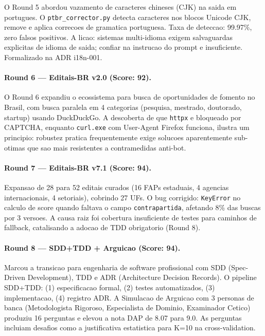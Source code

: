 O Round 5 abordou vazamento de caracteres chineses (CJK) na saida em
portugues. O \texttt{ptbr\_corrector.py} detecta caracteres nos blocos
Unicode CJK, remove e aplica correcoes de gramatica portuguesa. Taxa
de deteccao: 99.97\%, zero falsos positivos. A licao: sistemas
multi-idioma exigem salvaguardas explicitas de idioma de saida; confiar
na instrucao do prompt e insuficiente. Formalizado na ADR i18n-001.

\paragraph{Round 6 --- Editais-BR v2.0 (Score: 92).}

O Round 6 expandiu o ecossistema para busca de oportunidades de fomento
no Brasil, com busca paralela em 4 categorias (pesquisa, mestrado,
doutorado, startup) usando DuckDuckGo. A descoberta de que \texttt{httpx}
e bloqueado por CAPTCHA, enquanto \texttt{curl.exe} com User-Agent Firefox
funciona, ilustra um principio: robustez pratica frequentemente exige
solucoes aparentemente sub-otimas que sao mais resistentes a contramedidas
anti-bot.

\paragraph{Round 7 --- Editais-BR v7.1 (Score: 94).}

Expansao de 28 para 52 editais curados (16 FAPs estaduais, 4 agencias
internacionais, 4 setoriais), cobrindo 27 UFs. O bug corrigido:
\texttt{KeyError} no calculo de score quando faltava o campo
\texttt{contrapartida}, afetando 8\% das buscas por 3 versoes. A causa
raiz foi cobertura insuficiente de testes para caminhos de fallback,
catalisando a adocao de TDD obrigatorio (Round 8).

\paragraph{Round 8 --- SDD+TDD + Arguicao (Score: 94).}

Marcou a transicao para engenharia de software profissional com SDD
(Spec-Driven Development), TDD e ADR (Architecture Decision Records).
O pipeline SDD+TDD: (1) especificacao formal, (2) testes automatizados,
(3) implementacao, (4) registro ADR. A Simulacao de Arguicao com 3
personas de banca (Metodologista Rigoroso, Especialista de Dominio,
Examinador Cetico) produziu 16 perguntas e elevou a nota DAP de 8.07
para 9.0. As perguntas incluiam desafios como a justificativa
estatistica para K=10 na cross-validation.

